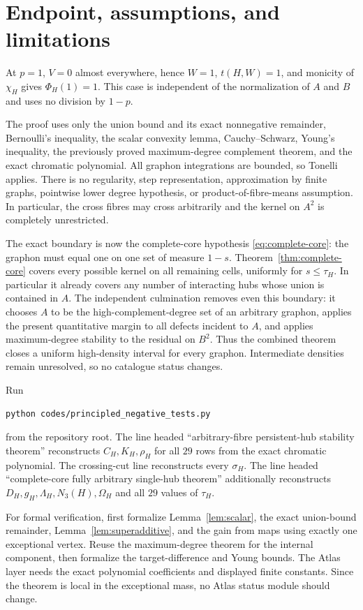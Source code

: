 \documentclass[11pt]{article}
\begin{document}
\section{Endpoint, assumptions, and limitations}

At $p=1$, $V=0$ almost everywhere, hence $W=1$, $t(H,W)=1$, and monicity of
$\chi_H$ gives $\Phi_H(1)=1$.  This case is independent of the normalization
of $A$ and $B$ and uses no division by $1-p$.

The proof uses only the union bound and its exact nonnegative remainder,
Bernoulli's inequality, the scalar convexity lemma, Cauchy--Schwarz, Young's
inequality, the previously proved maximum-degree complement theorem, and the
exact chromatic polynomial.  All graphon integrations are bounded, so Tonelli
applies.  There is no regularity, step representation, approximation by
finite graphs, pointwise lower degree hypothesis, or product-of-fibre-means
assumption.  In particular, the cross fibres may cross arbitrarily and the
kernel on $A^2$ is completely unrestricted.

The exact boundary is now the complete-core hypothesis
\eqref{eq:complete-core}: the graphon must equal one on one set of measure
$1-s$.  Theorem~\ref{thm:complete-core} covers every possible kernel on all
remaining cells, uniformly for $s\leq\tau_H$.  In particular it already
covers any number of interacting hubs whose union is contained in $A$.
The independent culmination
 removes even this
boundary: it chooses $A$ to be the high-complement-degree set of an arbitrary
graphon, applies the present quantitative margin to all defects incident to
$A$, and applies maximum-degree stability to the residual on $B^2$.  Thus the
combined theorem closes a uniform high-density interval for every graphon.
Intermediate densities remain unresolved, so no catalogue status changes.

Run
\begin{verbatim}
python codes/principled_negative_tests.py
\end{verbatim}
from the repository root.  The line headed ``arbitrary-fibre persistent-hub
stability theorem'' reconstructs $C_H,K_H,\rho_H$ for all $29$ rows from the
exact chromatic polynomial.  The crossing-cut line reconstructs every
$\sigma_H$.  The line headed ``complete-core fully arbitrary single-hub
theorem'' additionally reconstructs $D_H,g_H,\Lambda_H,N_3(H),\Omega_H$ and
all $29$ values of $\tau_H$.

For formal verification, first formalize Lemma~\ref{lem:scalar}, the exact
union-bound remainder, Lemma~\ref{lem:superadditive}, and the gain from maps
using exactly one exceptional vertex.  Reuse the maximum-degree theorem for
the internal component, then formalize the target-difference and Young bounds.
The Atlas layer needs the exact polynomial coefficients and displayed finite
constants.  Since the theorem is local in the exceptional mass, no Atlas
status module should change.
\end{document}
